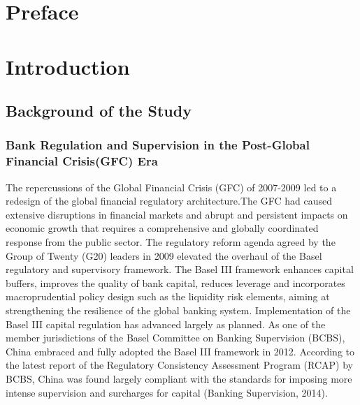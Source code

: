 \documentclass[
  12pt,
  a4paper,
]{scrreprt}
\renewcommand*\contentsname{Table of contents}
\newcommand\contentsname{Table of contents}
\begin{document}
  
\renewcommand*\contentsname{Table of contents}
{
\hypersetup{linkcolor=}
\setcounter{tocdepth}{2}
\tableofcontents
}

\chapter*{Preface}\label{preface}



\chapter{Introduction}\label{introduction}

\section{Background of the Study}\label{background-of-the-study}

\subsection{Bank Regulation and Supervision in the Post-Global Financial
Crisis(GFC)
Era}\label{bank-regulation-and-supervision-in-the-post-global-financial-crisisgfc-era}

The repercussions of the Global Financial Crisis (GFC) of 2007-2009 led
to a redesign of the global financial regulatory architecture.The GFC
had caused extensive disruptions in financial markets and abrupt and
persistent impacts on economic growth that requires a comprehensive and
globally coordinated response from the public sector. The regulatory
reform agenda agreed by the Group of Twenty (G20) leaders in 2009
elevated the overhaul of the Basel regulatory and supervisory framework.
The Basel III framework enhances capital buffers, improves the quality
of bank capital, reduces leverage and incorporates macroprudential
policy design such as the liquidity risk elements, aiming at
strengthening the resilience of the global banking system.
Implementation of the Basel III capital regulation has advanced largely
as planned. As one of the member jurisdictions of the Basel Committee on
Banking Supervision (BCBS), China embraced and fully adopted the Basel
III framework in 2012. According to the latest report of the Regulatory
Consistency Assessment Program (RCAP) by BCBS, China was found largely
compliant with the standards for imposing more intense supervision and
surcharges for capital (Banking Supervision, 2014).
\end{document}

